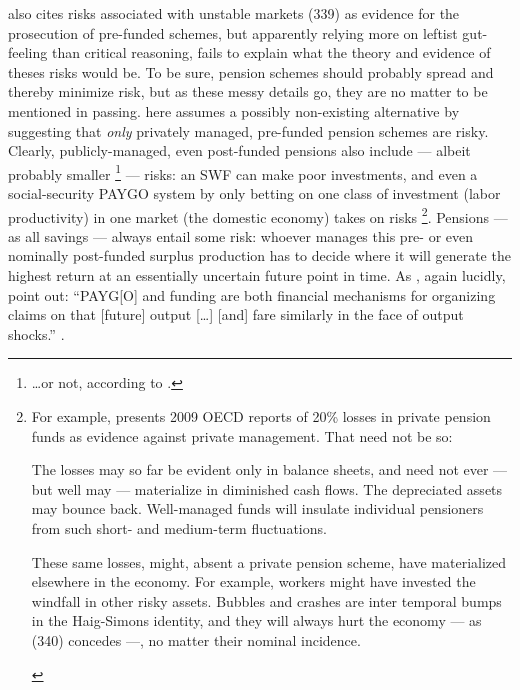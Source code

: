 \documentclass[11pt,a4paper,oneside,openright]{article}
\begin{document}
\begin{enumerate}
	\citeauthor{Cerami2009a} also cites risks associated with unstable markets (339) as evidence for the prosecution of pre-funded schemes, but apparently relying more on leftist gut-feeling than critical reasoning, fails to explain what the theory and evidence of theses risks would be. 
	To be sure, pension schemes should probably spread and thereby minimize risk, but as these messy details go, they are no matter to be mentioned in passing. \citeauthor{Cerami2009a} here assumes a possibly non-existing alternative by suggesting that \emph{only} privately managed, pre-funded pension schemes are risky.
	Clearly, publicly-managed, even post-funded pensions also include --- albeit probably smaller
	\footnote{
		\ldots or not, according to \cite[178]{Borsch-Supan2003}.
	} 
	--- risks: 
	an \gls{SWF} can make poor investments, and even a social-security PAYGO system by only betting on one class of investment (labor productivity) in one market (the domestic economy) takes on risks
	\footnote{
		For example, \citeauthor{Cerami2009a} presents  2009 \gls{OECD} reports of 20\% losses in private pension funds as evidence against private management. 
		That need not be so: 
	}. 
	Pensions --- as all savings --- always entail some risk: 
	whoever manages this pre- or even nominally post-funded surplus production has to decide where it will generate the highest return at an essentially uncertain future point in time. 
	As \citeauthor{Barr2005a}, again lucidly, point out: 
	``PAYG[O] and funding are both financial mechanisms for organizing claims on that [future] output [\ldots] [and] fare similarly in the face of output shocks.'' \citep[156]{Barr2005a}. 
	

\end{enumerate}
\end{document}
